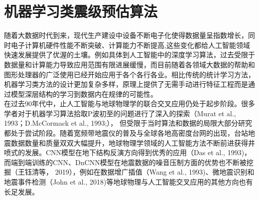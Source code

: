 
\chapter{机器学习类震级预估算法}
\indent 随着大数据时代到来，现代生产建设中设备不断电子化使得数据量呈指数增长，同时电子计算机硬件性能不断突破、计算能力不断提高,这些变化都给人工智能领域快速发展提供了优渥的土壤。例如具体到人工智能中的深度学习算法，过去受限于数据量和计算能力导致应用范围有限进展缓慢，而目前随着各领域大数据的帮助和图形处理器的广泛使用已经开始应用于各个各行各业。相比传统的统计学习方法，机器学习类方法的设计更加复杂多样，原理上提供了无需手动进行特征工程而是通过模型深层结构的学习到数据内在规律的可能性。\\
\indent 在过去90年代中，止人工智能与地球物理学的联合交叉应用仍处于起步阶段。很多学者对于机器学习算法拾取P波初至的问题进行了深入的探索（Murat et al., 1993；D.McCormack et al., 1993;）， 但受限于当时算法和数据的局限大部分研究都处于尝试阶段。随着宽频带地震仪的普及与全球各地高密度台网的出现，台站地震数据数量和质量双双大幅提升，地球物理学领域的人工智能方法不断前进获得井喷式的发展。CNN模型在地下结构反演方向得到优秀的应用（Das et al., 1993)，而端到端训练的CNN、DnCNN模型在地震数据的噪音压制方面的优势也不断被挖掘（王钰清等， 2019），例如在数据增广插值（Wang et al., 1993)、微地震识别和地震事件检测（John et al., 2018)等地球物理与人工智能交叉应用的其他方向也有长足发展。\\
